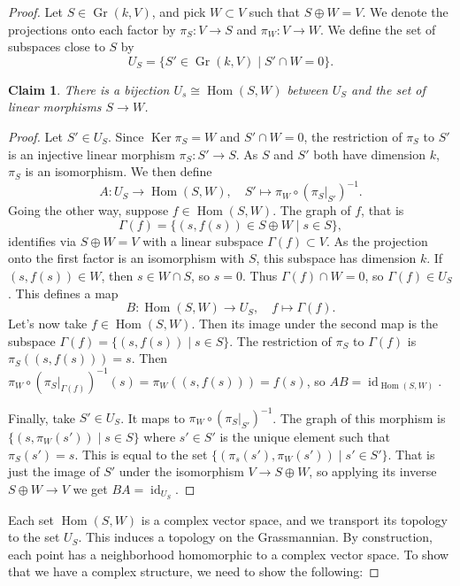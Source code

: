\documentclass[10pt,a4paper]{article}
\newtheorem*{claim}{Claim}
\newtheorem*{proof}{Proof}
\DeclareMathOperator{\Gr}{Gr}
\DeclareMathOperator{\Ker}{Ker}
\DeclareMathOperator{\Hom}{Hom}
\DeclareMathOperator{\id}{id}
\begin{document}
\begin{proof}
Let $S \in \Gr(k, V)$, and pick $W \subset V$ such that $S \oplus W = V$. We denote the projections onto each factor by $\pi_S : V \to S$ and $\pi_W : V \to W$. We define the set of subspaces close to $S$ by
$$
U_S =
\{
S' \in \Gr(k, V)
\mid
S' \cap W = 0
\}.
$$

\begin{claim}
There is a bijection $U_s \cong \Hom(S, W)$ between $U_S$ and the set of linear morphisms $S \to W$.
\end{claim}

\begin{proof}
Let $S' \in U_S$. Since $\Ker \pi_S = W$ and $S' \cap W = 0$, the restriction of $\pi_S$ to $S'$ is an injective linear morphism $\pi_S : S' \to S$. As $S$ and $S'$ both have dimension $k$, $\pi_S$ is an isomorphism. We then define
$$
A: U_S \to \Hom(S, W),
\quad
S' \mapsto \pi_W \circ (\pi_S|_{S'})^{-1}.
$$
Going the other way, suppose $f \in \Hom(S, W)$. The graph of $f$, that is
$$
\Gamma(f) = \{ (s, f(s)) \in S \oplus W \mid s \in S \},
$$
identifies via $S \oplus W = V$ with a linear subspace $\Gamma(f) \subset V$. As the projection onto the first factor is an isomorphism with $S$, this subspace has dimension $k$. If $(s, f(s)) \in W$, then $s \in W \cap S$, so $s = 0$. Thus $\Gamma(f) \cap W = 0$, so $\Gamma(f) \in U_S$. This defines a map
$$
B: \Hom(S, W) \to U_S,
\quad
f \mapsto \Gamma(f).
$$
Let's now take $f \in \Hom(S, W)$. Then its image under the second map is the subspace $\Gamma(f) = \{(s, f(s)) \mid s \in S\}$. The restriction of $\pi_S$ to $\Gamma(f)$ is $\pi_S((s, f(s))) = s$. Then $\pi_W \circ (\pi_S|_{\Gamma(f)})^{-1}(s) = \pi_W((s, f(s))) = f(s)$, so $AB = \id_{\Hom(S, W)}$.

Finally, take $S' \in U_S$. It maps to $\pi_W \circ (\pi_S|_{S'})^{-1}$. The graph of this morphism is $\{(s, \pi_W(s')) \mid s \in S\}$ where $s' \in S'$ is the unique element such that $\pi_S(s') = s$. This is equal to the set $\{(\pi_s(s'), \pi_W(s')) \mid s' \in S'\}$. That is just the image of $S'$ under the isomorphism $V \to S \oplus W$, so applying its inverse $S \oplus W \to V$ we get $BA = \id_{U_S}$.
\end{proof}

Each set $\Hom(S, W)$ is a complex vector space, and we transport its topology to the set $U_S$. This induces a topology on the Grassmannian. By construction, each point has a neighborhood homomorphic to a complex vector space. To show that we have a complex structure, we need to show the following:



\end{proof}
\end{document}
